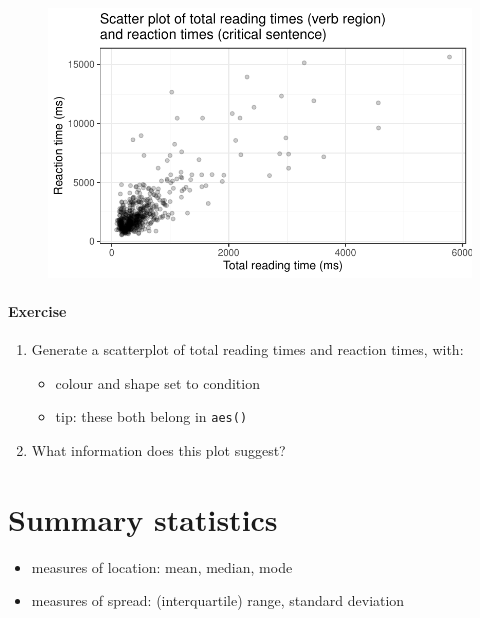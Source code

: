 \documentclass[
  letterpaper,
  DIV=11,
  numbers=noendperiod]{scrartcl}
\let\oldparagraph\paragraph
\renewcommand{\paragraph}[1]{\oldparagraph{#1}\mbox{}}
\providecommand{\tightlist}{%
  \setlength{\itemsep}{0pt}\setlength{\parskip}{0pt}}\usepackage{longtable,booktabs,array}
\begin{document}
\begin{figure}[H]

{\centering \includegraphics{_data_viz_files/figure-pdf/unnamed-chunk-25-1.pdf}

}

\end{figure}

\hypertarget{exercise-2}{%
\paragraph{Exercise}\label{exercise-2}}

\begin{enumerate}
\def\labelenumi{\arabic{enumi}.}
\tightlist
\item
  Generate a scatterplot of total reading times and reaction times,
  with:

  \begin{itemize}
  \tightlist
  \item
    colour and shape set to condition
  \item
    tip: these both belong in \texttt{aes()}
  \end{itemize}
\item
  What information does this plot suggest?
\end{enumerate}

\hypertarget{summary-statistics}{%
\section{Summary statistics}\label{summary-statistics}}

\begin{itemize}
\tightlist
\item
  measures of location: mean, median, mode
\item
  measures of spread: (interquartile) range, standard deviation
\end{itemize}
\end{document}

